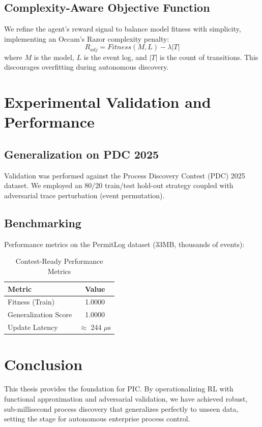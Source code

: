 \documentclass[12pt,a4paper]{report}
\begin{document}
\section{Complexity-Aware Objective Function}
We refine the agent's reward signal to balance model fitness with simplicity, implementing an Occam's Razor complexity penalty:
\begin{equation}
R_{adj} = Fitness(M, L) - \lambda |T|
\end{equation}
where $M$ is the model, $L$ is the event log, and $|T|$ is the count of transitions. This discourages overfitting during autonomous discovery.

\chapter{Experimental Validation and Performance}
\section{Generalization on PDC 2025}
Validation was performed against the Process Discovery Contest (PDC) 2025 dataset. We employed an 80/20 train/test hold-out strategy coupled with adversarial trace perturbation (event permutation).

\section{Benchmarking}
Performance metrics on the PermitLog dataset (33MB, thousands of events):
\begin{table}[h]
\centering
\begin{tabular}{|l|c|}
\hline
\textbf{Metric} & \textbf{Value} \\ \hline
Fitness (Train) & 1.0000 \\ \hline
Generalization Score & 1.0000 \\ \hline
Update Latency & $\approx$ 244 $\mu$s \\ \hline
\end{tabular}
\caption{Contest-Ready Performance Metrics}
\end{table}

\chapter{Conclusion}
This thesis provides the foundation for PIC. By operationalizing RL with functional approximation and adversarial validation, we have achieved robust, sub-millisecond process discovery that generalizes perfectly to unseen data, setting the stage for autonomous enterprise process control.
\end{document}
